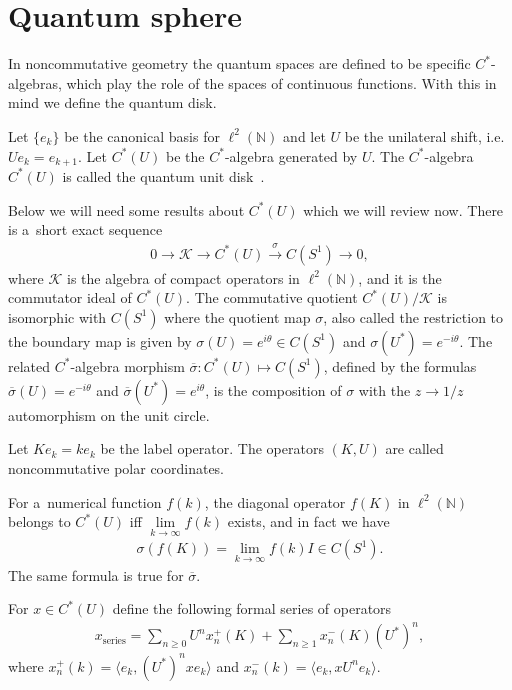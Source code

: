 \documentclass[11pt]{article}
\numberwithin{equation}{section}
\begin{document}
\section{Quantum sphere}\label{Section3}

In noncommutative geometry the quantum spaces are def\/ined to be specif\/ic $C^*$-algebras, which play the role of the
spaces of continuous functions.
With this in mind we def\/ine the quantum disk.

\begin{defin}
Let $\{e_k\}$ be the canonical basis for $\ell^2({\mathbb N})$ and let $U$ be the unilateral shift, i.e.
$Ue_k = e_{k+1}$.
Let $C^*(U)$ be the $C^*$-algebra generated by $U$.
The $C^*$-algebra $C^*(U)$ is called the quantum unit disk~\cite{KL}.
\end{defin}

Below we will need some results about $C^*(U)$ which we will review now.
There is a~short exact sequence
\begin{gather*}
0\longrightarrow \mathcal{K} \longrightarrow C^*(U) \overset{\sigma}{\longrightarrow} C(S^1) \longrightarrow 0,
\end{gather*}
where $ \mathcal{K} $ is the algebra of compact operators in $\ell^2({\mathbb N})$, and it is the commutator ideal of
$C^*(U)$.
The commutative quotient $C^*(U)/\mathcal{K}$ is isomorphic with $C(S^1)$ where the quotient map $\sigma$, also called
the restriction to the boundary map is given by $\sigma(U)= e^{i\theta}\in C(S^1) $ and $\sigma(U^*)=e^{-i\theta}$.
The related $C^*$-algebra morphism $\overline{\sigma}:C^*(U)\mapsto C(S^1)$, def\/ined by the formulas
$\overline{\sigma}(U)=e^{-i\theta}$ and $\overline{\sigma}(U^*) = e^{i\theta}$, is the composition of $\sigma$ with the
$z\to 1/z$ automorphism on the unit circle.

Let $Ke_k = ke_k$ be the label operator.
The operators $(K,U)$ are called noncommutative polar coordinates.

For a~numerical function $f(k)$, the diagonal operator $f(K)$ in $\ell^2({\mathbb N})$ belongs to $C^*(U)$ if\/f
$\lim\limits_{k\to\infty}f(k)$ exists, and in fact we have
\begin{gather*}
\sigma(f(K))=\lim_{k\to\infty}f(k)I\in C(S^1).
\end{gather*}
The same formula is true for $\overline{\sigma}$.

For $x\in C^*(U)$ def\/ine the following formal series of operators
\begin{gather*}
x_\textrm{series} = \sum\limits_{n\ge0} U^n x_n^+(K) + \sum\limits_{n\ge1} x_n^-(K)(U^*)^n,
\end{gather*}
where $x_n^+(k) = \langle e_k, (U^*)^nx e_k\rangle$ and $x_n^-(k) = \langle e_k, xU^n e_k\rangle$.
\end{document}
